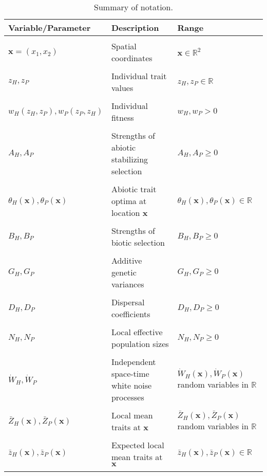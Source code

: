 \documentclass{article}
\begin{document}
\begin{table}[htbp]
\caption{Summary of notation.}
\label{Table:Parameters}
\centering
\begin{tabular}{lll}\hline
Variable/Parameter                  & Description                                  & Range                                                     \\ \hline \\
$\pmb x=(x_1,x_2)$                  & Spatial coordinates                          & $\pmb x\in\mathbb R^2$                                    \\ \\
$z_H,z_P$                           & Individual trait values                      & $z_H,z_P\in\mathbb R$                                     \\ \\
$w_H(z_H,z_P),w_P(z_P,z_H)$         & Individual fitness                           & $w_H,w_P>0$                                               \\ \\
$A_H,A_P$                           & Strengths of abiotic stabilizing selection   & $A_H,A_P\geq0$                                            \\ \\
$\theta_H(\pmb x),\theta_P(\pmb x)$ & Abiotic trait optima at location $\pmb x$    & $\theta_H(\pmb x),\theta_P(\pmb x)\in\mathbb R$           \\ \\
$B_H,B_P$                           & Strengths of biotic selection                & $B_H,B_P\geq0$                                            \\ \\
$G_H,G_P$                           & Additive genetic variances                   & $G_H,G_P\geq0$                                            \\ \\
$D_H,D_P$                           & Dispersal coefficients                       & $D_H,D_P\geq0$                                            \\ \\
$N_H,N_P$                           & Local effective population sizes             & $N_H,N_P\geq0$                                            \\ \\
$\dot W_H,\dot W_P$                 & Independent space-time white noise processes & $\dot W_H(\pmb x),\dot W_P(\pmb x)$ random variables in $\mathbb R$ \\ \\
$\bar Z_H(\pmb x),\bar Z_P(\pmb x)$ & Local mean traits at $\pmb x$                & $\bar Z_H(\pmb x),\bar Z_P(\pmb x)$ random variables in $\mathbb R$ \\ \\
$\bar z_H(\pmb x),\bar z_P(\pmb x)$ & Expected local mean traits at $\pmb x$       & $\bar z_H(\pmb x),\bar z_P(\pmb x)\in\mathbb R$                     \\ \\ \hline
\end{tabular}
\bigskip{}
\end{table}
\end{document}
